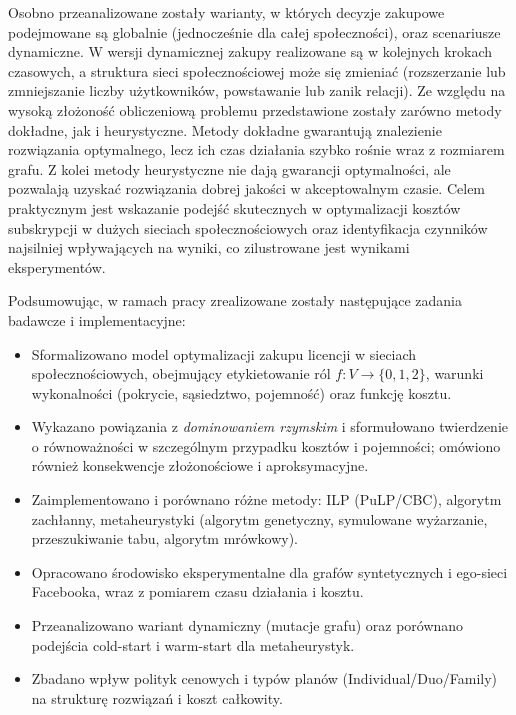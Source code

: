 Osobno przeanalizowane zostały warianty, w których decyzje zakupowe podejmowane są globalnie (jednocześnie dla całej społeczności), oraz scenariusze dynamiczne. W wersji dynamicznej zakupy realizowane są w kolejnych krokach czasowych, a struktura sieci społecznościowej może się zmieniać (rozszerzanie lub zmniejszanie liczby użytkowników, powstawanie lub zanik relacji). Ze względu na wysoką złożoność obliczeniową problemu przedstawione zostały zarówno metody dokładne, jak i heurystyczne. Metody dokładne gwarantują znalezienie rozwiązania optymalnego, lecz ich czas działania szybko rośnie wraz z rozmiarem grafu. Z kolei metody heurystyczne nie dają gwarancji optymalności, ale pozwalają uzyskać rozwiązania dobrej jakości w akceptowalnym czasie. Celem praktycznym jest wskazanie podejść skutecznych w optymalizacji kosztów subskrypcji w dużych sieciach społecznościowych oraz identyfikacja czynników najsilniej wpływających na wyniki, co zilustrowane jest wynikami eksperymentów.

Podsumowując, w ramach pracy zrealizowane zostały następujące zadania badawcze i implementacyjne:
\begin{itemize}
  \item Sformalizowano model optymalizacji zakupu licencji w sieciach społecznościowych, obejmujący etykietowanie ról $f:V\to\{0,1,2\}$, warunki wykonalności (pokrycie, sąsiedztwo, pojemność) oraz funkcję kosztu.
  \item Wykazano powiązania z \emph{dominowaniem rzymskim} i sformułowano twierdzenie o równoważności w szczególnym przypadku kosztów i pojemności; omówiono również konsekwencje złożonościowe i aproksymacyjne.
  \item Zaimplementowano i porównano różne metody: ILP (PuLP/CBC), algorytm zachłanny, metaheurystyki (algorytm genetyczny, symulowane wyżarzanie, przeszukiwanie tabu, algorytm mrówkowy).
  \item Opracowano środowisko eksperymentalne dla grafów syntetycznych i ego-sieci Facebooka, wraz z pomiarem czasu działania i kosztu.
  \item Przeanalizowano wariant dynamiczny (mutacje grafu) oraz porównano podejścia cold-start i warm-start dla metaheurystyk.
  \item Zbadano wpływ polityk cenowych i typów planów (Individual/Duo/Family) na strukturę rozwiązań i koszt całkowity.
\end{itemize}

